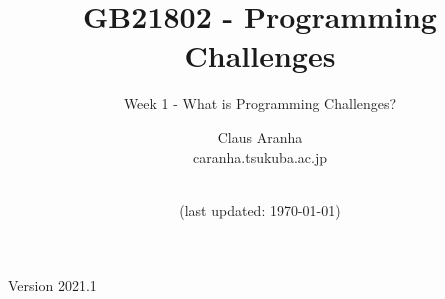 \documentclass[aspectratio=169]{beamer}
\title[Programming Challenges]{GB21802 - Programming Challenges}
\subtitle[Week 1]{Week 1 - What is Programming Challenges?}
\author[Claus Aranha]{Claus Aranha\\{\footnotesize caranha\@@cs.tsukuba.ac.jp}}
\institute[]{Department of Computer Science}
\date[]{\\{\smaller(last updated: \today)}}
\begin{document}
\begin{CJK}{UTF8}{ipxm}

\begin{frame}
\maketitle
\vfill

\hfill Version 2021.1
\end{frame}





\end{CJK}
\end{document}
